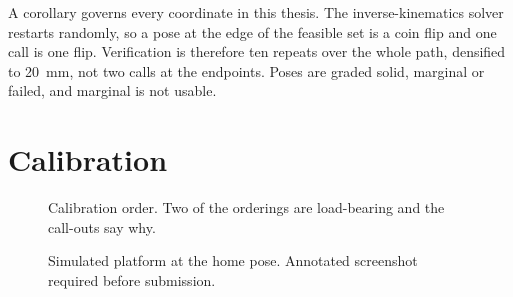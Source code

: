 A corollary governs every coordinate in this thesis. The inverse-kinematics
solver restarts randomly, so a pose at the edge of the feasible set is a coin
flip and one call is one flip. Verification is therefore ten repeats over the
whole path, densified to \SI{20}{\milli\metre}, not two calls at the
endpoints. Poses are graded solid, marginal or failed, and marginal is not
usable.

\section{Calibration}

\begin{figure}
  \centering
  \resizebox{\textheight}{!}{}
  \caption[Calibration procedure]{Calibration order. Two of the orderings are
  load-bearing and the call-outs say why.}
  \label{fig:calibration}
\end{figure}

\begin{figure}[htbp]
  \centering
  \caption[The model at home]{Simulated platform at the home pose. Annotated
  screenshot required before submission.}
  \label{fig:rviz-home}
\end{figure}
